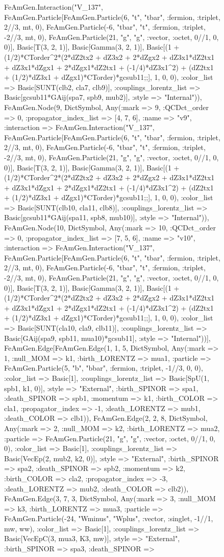 \documentclass{revtex4}
\begin{document}
\begin{figure}[!htb]
\begin{center}
{FeAmGen.Interaction("V_137", FeAmGen.Particle[FeAmGen.Particle(6, "t", "tbar", :fermion, :triplet, 2//3, mt, 0), FeAmGen.Particle(-6, "tbar", "t", :fermion, :triplet, -2//3, mt, 0), FeAmGen.Particle(21, "g", "g", :vector, :octet, 0//1, 0, 0)], Basic[T(3, 2, 1)], Basic[Gamma(3, 2, 1)], Basic[(1 + (1/2)*CTorder^2*(2*dZ2tx2 + dZ3x2 + 2*dZgx2 + dZ3x1*dZ2tx1 + dZ3x1*dZgx1 + 2*dZgx1*dZ2tx1 + (-1/4)*dZ3x1^2) + (dZ2tx1 + (1/2)*dZ3x1 + dZgx1)*CTorder)*gcsub11;;], 1, 0, 0), :color_list => Basic[SUNT(clb2, cla7, clb9)], :couplings_lorentz_list => Basic[gcsub11*GAij(spa7, spb9, mub2)], :style => "Internal")), FeAmGen.Node(9, Dict{Symbol, Any}(:mark => 9, :QCDct_order => 0, :propagator_index_list => [4, 7, 6], :name => "v9", :interaction => FeAmGen.Interaction("V_137", FeAmGen.Particle[FeAmGen.Particle(6, "t", "tbar", :fermion, :triplet, 2//3, mt, 0), FeAmGen.Particle(-6, "tbar", "t", :fermion, :triplet, -2//3, mt, 0), FeAmGen.Particle(21, "g", "g", :vector, :octet, 0//1, 0, 0)], Basic[T(3, 2, 1)], Basic[Gamma(3, 2, 1)], Basic[(1 + (1/2)*CTorder^2*(2*dZ2tx2 + dZ3x2 + 2*dZgx2 + dZ3x1*dZ2tx1 + dZ3x1*dZgx1 + 2*dZgx1*dZ2tx1 + (-1/4)*dZ3x1^2) + (dZ2tx1 + (1/2)*dZ3x1 + dZgx1)*CTorder)*gcsub11;;], 1, 0, 0), :color_list => Basic[SUNT(clb10, cla11, clb8)], :couplings_lorentz_list => Basic[gcsub11*GAij(spa11, spb8, mub10)], :style => "Internal")), FeAmGen.Node(10, Dict{Symbol, Any}(:mark => 10, :QCDct_order => 0, :propagator_index_list => [7, 5, 6], :name => "v10", :interaction => FeAmGen.Interaction("V_137", FeAmGen.Particle[FeAmGen.Particle(6, "t", "tbar", :fermion, :triplet, 2//3, mt, 0), FeAmGen.Particle(-6, "tbar", "t", :fermion, :triplet, -2//3, mt, 0), FeAmGen.Particle(21, "g", "g", :vector, :octet, 0//1, 0, 0)], Basic[T(3, 2, 1)], Basic[Gamma(3, 2, 1)], Basic[(1 + (1/2)*CTorder^2*(2*dZ2tx2 + dZ3x2 + 2*dZgx2 + dZ3x1*dZ2tx1 + dZ3x1*dZgx1 + 2*dZgx1*dZ2tx1 + (-1/4)*dZ3x1^2) + (dZ2tx1 + (1/2)*dZ3x1 + dZgx1)*CTorder)*gcsub11;;], 1, 0, 0), :color_list => Basic[SUNT(cla10, cla9, clb11)], :couplings_lorentz_list => Basic[GAij(spa9, spb11, mua10)*gcsub11], :style => "Internal"))], FeAmGen.Edge[FeAmGen.Edge(1, 1, 5, Dict{Symbol, Any}(:mark => 1, :null_MOM => k1, :birth_LORENTZ => mua1, :particle => FeAmGen.Particle(5, "b", "bbar", :fermion, :triplet, -1//3, 0, 0), :color_list => Basic[1], :couplings_lorentz_list => Basic[SpU(1, spb1, k1, 0)], :style => "External", :birth_SPINOR => spa1, :death_SPINOR => spb1, :momentum => k1, :birth_COLOR => cla1, :propagator_index => -1, :death_LORENTZ => mub1, :death_COLOR => clb1)), FeAmGen.Edge(2, 2, 8, Dict{Symbol, Any}(:mark => 2, :null_MOM => k2, :birth_LORENTZ => mua2, :particle => FeAmGen.Particle(21, "g", "g", :vector, :octet, 0//1, 0, 0), :color_list => Basic[1], :couplings_lorentz_list => Basic[VecEp(2, mub2, k2, 0)], :style => "External", :birth_SPINOR => spa2, :death_SPINOR => spb2, :momentum => k2, :birth_COLOR => cla2, :propagator_index => -3, :death_LORENTZ => mub2, :death_COLOR => clb2)), FeAmGen.Edge(3, 7, 3, Dict{Symbol, Any}(:mark => 3, :null_MOM => k3, :birth_LORENTZ => mua3, :particle => FeAmGen.Particle(-24, "Wminus", "Wplus", :vector, :singlet, -1//1, mw, ww), :color_list => Basic[1], :couplings_lorentz_list => Basic[VecEpC(3, mua3, K3, mw)], :style => "External", :birth_SPINOR => spa3, :death_SPINOR => }
\end{center}
\end{figure}
\end{document}
